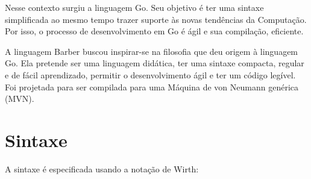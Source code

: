 \documentclass[a4paper,12pt]{report}
\begin{document}
    Nesse contexto surgiu a linguagem Go. Seu objetivo é ter uma sintaxe simplificada  ao mesmo tempo trazer suporte às novas tendências da Computação. Por isso, o processo de desenvolvimento em Go é ágil e sua compilação, eficiente.

    A linguagem Barber buscou inspirar-se na filosofia que deu origem à linguagem Go. Ela pretende ser uma linguagem didática, ter uma sintaxe compacta, regular e de fácil aprendizado, permitir o desenvolvimento ágil e ter um código legível. Foi projetada para ser compilada para uma Máquina de von Neumann genérica (MVN). 

    \newpage
    \section*{Sintaxe}
    A sintaxe é especificada usando a notação de Wirth:
\end{document}
